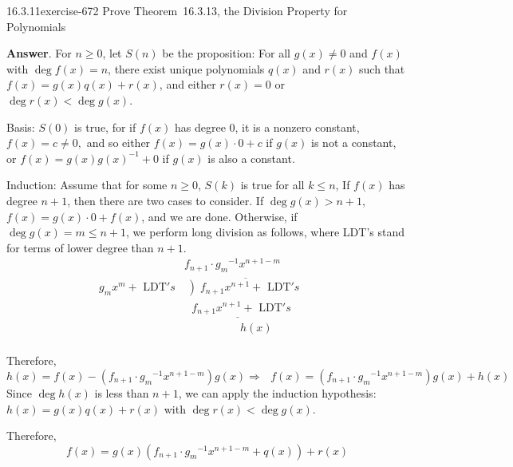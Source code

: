\documentclass[twoside,10pt,]{book}
\numberwithin{equation}{section}
\begin{document}
\begin{divisionsolution}{16.3.11}{}{exercise-672}%
\hypertarget{p-6006}{}%
Prove Theorem~16.3.13, the Division Property for Polynomials%
\par\smallskip%
\noindent\textbf{Answer}.\quad%
\hypertarget{p-6007}{}%
For \(n \geq  0\), let \(S(n)\) be the proposition: For all \(g(x)\neq 0\) and \(f(x)\) with \(\deg  f(x) = n\), there exist unique polynomials \(q(x)\) and \(r(x)\) such that \(f(x)=g(x)q(x)+r(x)\), and either \(r(x)=0\) or  \(\deg  r(x) < \deg  g(x)\).%
\par
\hypertarget{p-6008}{}%
Basis: \(S(0)\) is true, for if \(f(x)\)  has degree 0, it is a nonzero constant, \(f(x)=c\neq 0,\) and so either \(f(x) =g(x)\cdot 0 + c\)  if \(g(x)\) is not a constant, or \(f(x) = g(x)g(x)^{-1}+0\) if \(g(x)\) is also a constant.%
\par
\hypertarget{p-6009}{}%
Induction: Assume that for some \(n\geq 0\), \(S(k)\) is true for all \(k \leq  n\), If \(f(x)\) has degree \(n+1\), then there are two cases to consider. If \(\deg  g(x) > n + 1\), \(f(x) = g(x)\cdot 0 + f(x)\), and we are done. Otherwise, if \(\deg  g(x) =m \leq  n + 1\), we perform long division as follows, where LDT's stand for terms of lower degree than \(n+1\).%
\begin{equation*}
\begin{array}{rll}
& f_{n+1}\cdot g_m{}^{-1}x^{n+1-m} \\
g_mx^m+ \textrm{ LDT}'s & \overline{\left) f_{n+1}x^{n+1}\right.+ \textrm{ LDT}'s 
\textrm{                     }}& \\ & \underline{\textrm{    }f_{n+1}x^{n+1}+ \textrm{ LDT}'s}\textrm{ 
}\\& \quad\quad\quad\quad\quad h(x) \\
\end{array}
\end{equation*}
%
\par
\hypertarget{p-6010}{}%
Therefore,%
\begin{equation*}
h(x) = f(x)-\left(f_{n+1}\cdot g_m{}^{-1}x^{n+1-m}\right) g(x) \Rightarrow \textrm{   }f(x) = \left(f_{n+1}\cdot g_m{}^{-1}x^{n+1-m}\right)
g(x)+h(x) 
\end{equation*}
Since \(\deg  h(x)\) is less than \(n+1\), we can apply the induction hypothesis: \(h(x) = g(x)q(x) + r(x)\) with  \(\deg  r(x) < \deg  g(x)\).%
\par
\hypertarget{p-6011}{}%
Therefore,%
\begin{equation*}
f(x) = g(x)\left(f_{n+1}\cdot g_m{}^{-1}x^{n+1-m}+ q(x)\right) + r(x)

\end{equation*}
\end{divisionsolution}
\end{document}
